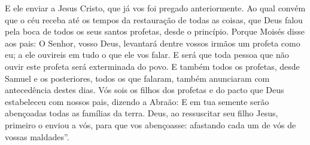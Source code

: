 {  E ele enviar a Jesus Cristo, que já vos foi pregado anteriormente.
  Ao qual convém que o céu receba até os tempos da restauração de todas as coisas, que Deus falou pela boca de todos os seus santos profetas, desde o princípio.
  Porque Moisés disse aos
{} pais: O Senhor, vosso Deus, levantará dentre vossos irmãos um profeta como eu; a ele ouvireis em tudo o que ele vos falar.
  E será que toda pessoa
 que não ouvir este profeta será exterminada do povo.
  E também todos os profetas, desde Samuel e os posteriores, todos os que falaram, também anunciaram com antecedência destes dias.
  Vós sois os filhos dos profetas e do pacto que Deus estabeleceu com nossos pais, dizendo a Abraão: E em tua semente serão abençoadas todas as famílias da terra.
  Deus, ao ressuscitar seu filho Jesus, primeiro o enviou a vós, para que
{} vos abençoasse: afastando cada um de vós de vossas maldades”.
\par }

